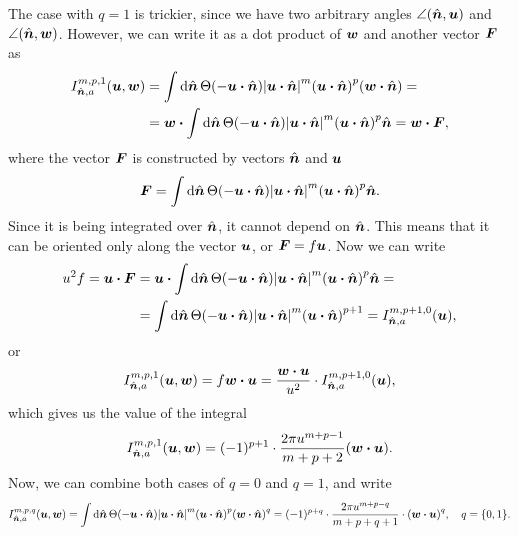 \documentclass[aps,prl,preprint,groupedaddress,10pt]{revtex4-2}
\begin{document}
The case with $q=1$ is trickier, since we have two arbitrary angles $\angle(\hat{\vb*{n}},\vb*{u})$ and
$\angle(\hat{\vb*{n}},\vb*{w})$. However, we can write it as a dot product of $\vb*{w}$ and another vector
$\vb*{F}$ as
\begin{equation}
    \begin{split}
        I_{\bn,a}^{m,p,1}(\bu,\bw)&=\int\dd{\bn}\Theta\pqty{-\bu\vdot\bn}
        \abs{\bu\vdot\bn}^m\pqty{\bu\vdot\bn}^p\pqty{\bw\vdot\bn}=\\
        &=\bw\vdot\int\dd{\bn}\Theta\pqty{-\bu\vdot\bn}
        \abs{\bu\vdot\bn}^m\pqty{\bu\vdot\bn}^p\bn=\bw\vdot\bF,
    \end{split}
\end{equation}
where the vector $\vb*{F}$ is constructed by vectors $\hat{\vb*{n}}$ and $\vb*{u}$
\begin{equation}
    \bF = \int\dd{\bn}\Theta\pqty{-\bu\vdot\bn}\abs{\bu\vdot\bn}^m\pqty{\bu\vdot\bn}^p\bn.
\end{equation}
Since it is being integrated
over $\hat{\vb*{n}}$, it cannot depend on $\hat{\vb*{n}}$. This means that it can be oriented only along the
vector $\vb*{u}$, or $\vb*{F}=f\vb*{u}$. Now we can write
\begin{equation}
    \begin{split}
        u^2f = \bu\vdot\bF &= \bu\vdot
        \int\dd{\bn}\Theta\pqty{-\bu\vdot\bn}\abs{\bu\vdot\bn}^m\pqty{\bu\vdot\bn}^p\bn=\\
        &=\int\dd{\bn}\Theta\pqty{-\bu\vdot\bn}\abs{\bu\vdot\bn}^m\pqty{\bu\vdot\bn}^{p+1}=
        I_{\bn,a}^{m,p+1,0}(\bu),
    \end{split}
\end{equation}
or
\begin{equation}
    I_{\bn,a}^{m,p,1}(\bu,\bw)=f\bw\vdot\bu=\frac{\bw\vdot\bu}{u^2}
    \cdot I_{\bn,a}^{m,p+1,0}(\bu),
\end{equation}
which gives us the value of the integral
\begin{equation}
    I_{\bn,a}^{m,p,1}(\bu,\bw)=(-1)^{p+1}\cdot\frac{2\pi u^{m+p-1}}{m+p+2}\pqty{\bw\vdot\bu}.
\end{equation}
Now, we can combine both cases of $q=0$ and $q=1$, and write
\begin{equation}
    I_{\bn,a}^{m,p,q}(\bu,\bw)=\int\dd{\bn}\Theta\pqty{-\bu\vdot\bn}
    \abs{\bu\vdot\bn}^m\pqty{\bu\vdot\bn}^p\pqty{\bw\vdot\bn}^q=
    (-1)^{p+q}\cdot\frac{2\pi u^{m+p-q}}{m+p+q+1}
    \cdot\pqty{\bw\vdot\bu}^{q},\quad q=\Bqty{0,1}.
\end{equation}
\end{document}
